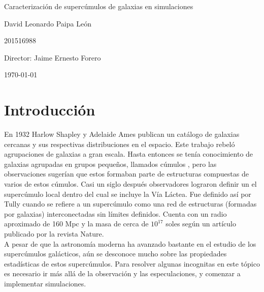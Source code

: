 \documentclass[12pt]{article}
\begin{document}
\begin{center}
\Huge
Caracterización de supercúmulos de galaxias en simulaciones

\vspace{3mm}
\Large David Leonardo Paipa León


\large
201516988


\vspace{2mm}
\Large
Director: Jaime Ernesto Forero

\normalsize
\vspace{2mm}

\today
\end{center}


\normalsize
\section{Introducción}


En 1932 Harlow Shapley y Adelaide Ames publican un catálogo de
galaxias cercanas y sus respectivas distribuciones en el
espacio\cite{catalog}\cite{Shapley}.
Este trabajo rebel\'o agrupaciones de galaxias a gran escala. 
Hasta entonces se tenía conocimiento de galaxias agrupadas en grupos
pequeños, llamados cúmulos ,  pero las observaciones sugerían que estos formaban parte de estructuras
compuestas de varios de estos cúmulos. 
Casi un siglo despu\'es observadores lograron definir un 
el supercúmulo local dentro del cual se incluye la Vía Láctea. 
Fue definido así por Tully \cite{tully} cuando se refiere a un
supercúmulo como una red de estructuras (formadas por galaxias)
interconectadas sin límites definidos.
Cuenta con un radio aproximado
de 160 Mpc y la masa de cerca de $10^{17}$ soles según un artículo publicado por la revista
Nature\cite{nature}.\\  

A pesar de que la astronomía moderna ha avanzado bastante en el estudio de los supercúmulos galácticos, aún se desconoce mucho sobre las propiedades estadísticas de estos supercúmulos. Para resolver algunas incognitas en este tópico es necesario ir más allá de la observación y las especulaciones, y comenzar a implementar simulaciones.\\
\end{document}
